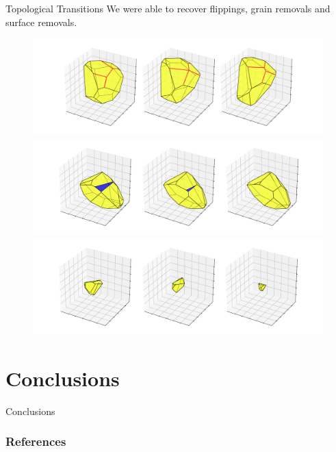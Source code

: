\documentclass[usenames,dvipsnames]{beamer}
\begin{document}
\begin{frame}{Topological Transitions}
We were able to recover flippings, grain removals and surface removals.
\vspace{-0.2em}
\begin{figure}
    \centering
    \includegraphics[scale=0.2]{figures/3d_voronoi/3D_flipping.pdf}\\
    \includegraphics[scale=0.2]{figures/3d_voronoi/3D_surface_removal.pdf}\\
    \includegraphics[scale=0.2]{figures/3d_voronoi/3D_grain_removal.pdf}
\end{figure}
\end{frame}

\section{Conclusions}
\begin{frame}{Conclusions}

\end{frame}

\appendix
\begin{frame}[allowframebreaks]
    \frametitle{References}
    
    
\end{frame}
\end{document}
